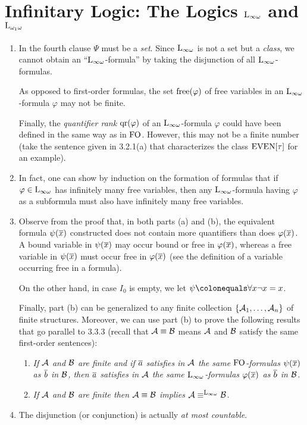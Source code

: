 \section{Infinitary Logic: The Logics $\inflog$ and $\dlog{\omega_1}$}
\begin{enumerate}[1.]
%
\item {} In the fourth clause $\Psi$ must be a \emph{set}. Since $\inflog$ is not a set but a \emph{class}, we cannot obtain an ``$\inflog$-formula'' by taking the disjunction of all $\inflog$-formulas.

As opposed to first-order formulas, the set $\mathrm{free}(\varphi)$ of free variables in an $\inflog$-formula $\varphi$ may not be finite.

Finally, the \emph{quantifier rank} $\mathrm{qr}(\varphi)$ of an $\inflog$-formula $\varphi$ could have been defined in the same way as in $\folog$. However, this may not be a finite number (take the sentence given in 3.2.1(a) that characterizes the class $\mathrm{EVEN}{[\tau]}$ for an example).
%
\item {} In fact, one can show by induction on the formation of formulas that if $\varphi \in \inflog$ has infinitely many free variables, then any $\inflog$-formula having $\varphi$ as a subformula must also have infinitely many free variables.
%
\item {} Observe from the proof that, in both parts (a) and (b), the equivalent formula $\psi(\overline{x})$ constructed does not contain more quantifiers than does $\varphi(\overline{x})$. A bound variable in $\psi(\overline{x})$ may occur bound or free in $\varphi(\overline{x})$, whereas a free variable in $\psi(\overline{x})$ must occur free in $\varphi(\overline{x})$ (see the definition of a variable occurring free in a formula).

On the other hand, in case $I_0$ is empty, we let $\psi \defas \forall x \neg x = x$.

Finally, part (b) can be generalized to any finite collection ${\{\mathcal{A}_1, \ldots, \mathcal{A}_n\}}$ of finite structures. Moreover, we can use part (b) to prove the following results that go parallel to 3.3.3 (recall that $\mathcal{A} \equiv \mathcal{B}$ means $\mathcal{A}$ and $\mathcal{B}$ satisfy the same first-order sentences):
\begin{enumerate}[(1)]
\item \emph{If $\mathcal{A}$ and $\mathcal{B}$ are finite and if $\overline{a}$ satisfies in $\mathcal{A}$ the same $\folog$-formulas $\psi(\overline{x})$ as $\overline{b}$ in $\mathcal{B}$, then $\overline{a}$ satisfies in $\mathcal{A}$ the same $\inflog$-formulas $\varphi(\overline{x})$ as $\overline{b}$ in $\mathcal{B}$.}
\item \emph{If $\mathcal{A}$ and $\mathcal{B}$ are finite then $\mathcal{A} \equiv \mathcal{B}$ implies $\strct{A} \equv^{\inflog} \strct{B}$.}
\end{enumerate}
%
\item {} The disjunction (or conjunction) is actually \emph{at most countable}.


\end{enumerate}
